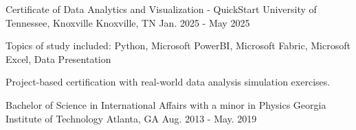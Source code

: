 

\begin{cventries}
	
\cventry
	{Certificate of Data Analytics and Visualization - QuickStart} %
	{University of Tennessee, Knoxville} %
	{Knoxville, TN} %
	{Jan. 2025 - May 2025} %
	{
		\begin{cvitems} %
			\item {Topics of study included: Python, Microsoft PowerBI, Microsoft Fabric, Microsoft Excel, Data Presentation}
			\item {Project-based certification with real-world data analysis simulation exercises.}
		\end{cvitems}
	}
	\vspace{4mm}

  \cventry
    {Bachelor of Science in International Affairs with a minor in Physics} %
    {Georgia Institute of Technology} %
    {Atlanta, GA} %
    {Aug. 2013 - May. 2019} %
    {
      \begin{cvitems} %
      \end{cvitems}
    }
    \vspace{4mm}

\end{cventries}
